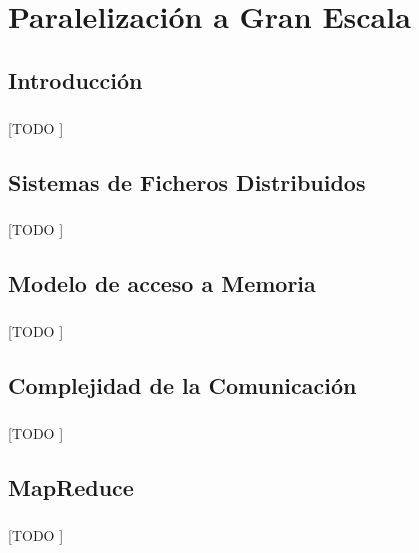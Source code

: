 \documentclass{subfiles}
\begin{document}
  \chapter{Paralelización a Gran Escala}
  \label{chap:parallel}

    \section{Introducción}
    \label{sec:parallel_intro}

      \paragraph{}
      [TODO ]

    \section{Sistemas de Ficheros Distribuidos}
    \label{sec:distributed_file_systems}

      \paragraph{}
      [TODO ]

    \section{Modelo de acceso a Memoria}
    \label{sec:memory_model}

      \paragraph{}
      [TODO ]

    \section{Complejidad de la Comunicación}
    \label{sec:communication_complexity}

      \paragraph{}
      [TODO ]


    \section{MapReduce}
    \label{sec:map_reduce}

      \paragraph{}
      [TODO ]
\end{document}
